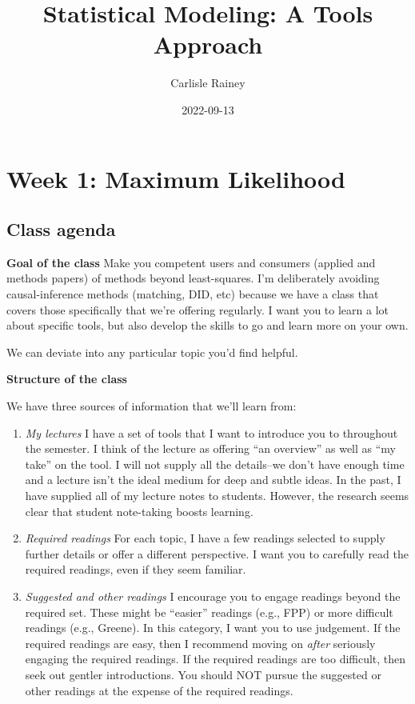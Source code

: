 \documentclass[
]{book}
\title{Statistical Modeling: A Tools Approach}
\author{Carlisle Rainey}
\date{2022-09-13}
\providecommand{\tightlist}{%
  \setlength{\itemsep}{0pt}\setlength{\parskip}{0pt}}
\begin{document}
\frontmatter
\maketitle

\mainmatter
\hypertarget{week-1-maximum-likelihood}{%
\chapter{Week 1: Maximum Likelihood}\label{week-1-maximum-likelihood}}

\hypertarget{class-agenda}{%
\section{Class agenda}\label{class-agenda}}

\textbf{Goal of the class} Make you competent users and consumers
(applied and methods papers) of methods beyond least-squares. I'm
deliberately avoiding causal-inference methods (matching, DID, etc)
because we have a class that covers those specifically that we're
offering regularly. I want you to learn a lot about specific tools, but
also develop the skills to go and learn more on your own.

We can deviate into any particular topic you'd find helpful.

\textbf{Structure of the class}

We have three sources of information that we'll learn from:

\begin{enumerate}
\def\labelenumi{\arabic{enumi}.}
\tightlist
\item
  \emph{My lectures} I have a set of tools that I want to introduce you
  to throughout the semester. I think of the lecture as offering ``an
  overview'' as well as ``my take'' on the tool. I will not supply all
  the details--we don't have enough time and a lecture isn't the ideal
  medium for deep and subtle ideas. In the past, I have supplied all of
  my lecture notes to students. However, the research seems clear that
  student note-taking boosts learning.
\item
  \emph{Required readings} For each topic, I have a few readings
  selected to supply further details or offer a different perspective. I
  want you to carefully read the required readings, even if they seem
  familiar.
\item
  \emph{Suggested and other readings} I encourage you to engage readings
  beyond the required set. These might be ``easier'' readings (e.g.,
  FPP) or more difficult readings (e.g., Greene). In this category, I
  want you to use judgement. If the required readings are easy, then I
  recommend moving on \emph{after} seriously engaging the required
  readings. If the required readings are too difficult, then seek out
  gentler introductions. You should NOT pursue the suggested or other
  readings at the expense of the required readings.
\end{enumerate}
\end{document}
